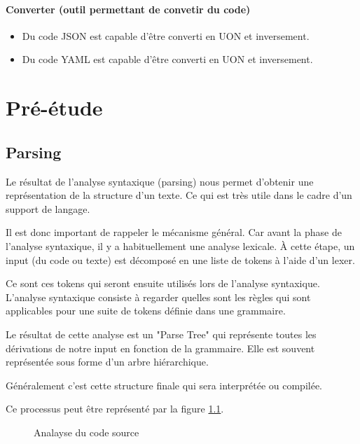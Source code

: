 \documentclass[
    iict, %
    il, %
]{heig-tb}
\begin{document}
\subsubsection*{Converter (outil permettant de convetir du code)}
\begin{itemize}
    \item Du code JSON est capable d'être converti en UON et inversement.
    \item Du code YAML est capable d'être converti en UON et inversement.
\end{itemize}

\chapter{Pré-étude}

\section{Parsing}\label{parsing}

Le résultat de l'analyse syntaxique (parsing) nous permet d'obtenir une représentation de la structure d'un texte. Ce qui est très utile dans le cadre d'un support de langage.

Il est donc important de rappeler le mécanisme général. Car avant la phase de l'analyse syntaxique, il y a habituellement une analyse lexicale.
À cette étape, un input (du code ou texte) est décomposé en une liste de tokens à l'aide d'un lexer.

Ce sont ces tokens qui seront ensuite utilisés lors de l'analyse syntaxique.
L'analyse syntaxique consiste à regarder quelles sont les règles qui sont applicables pour une suite de tokens définie dans une grammaire.

Le résultat de cette analyse est un "Parse Tree" qui représente toutes les dérivations de notre input en fonction de la grammaire.
Elle est souvent représentée sous forme d'un arbre hiérarchique.

Généralement c'est cette structure finale qui sera interprétée ou compilée.

Ce processus peut être représenté par la figure \ref{Analayse du code source}.

\begin{figure}[!h]
    \begin{center}
    \end{center}
    \caption[Analayse du code source]{\label{Analayse du code source} Analayse du code source}
\end{figure}
\end{document}
